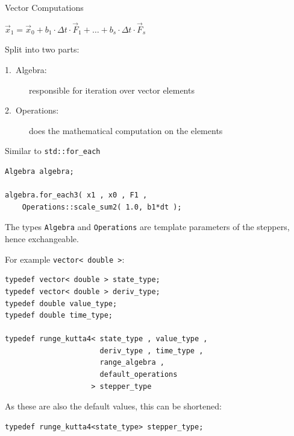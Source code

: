\documentclass{beamer}
\newcommand{\heading}[1]{\centerline{\Large #1} \vspace{0.5em}}
\begin{document}
\begin{frame}[fragile]
 \heading{Vector Computations}

\centerline{$\vec x_1 = \vec x_0 + b_1\cdot \Delta t \cdot \vec F_1 + \dots + b_s\cdot \Delta t \cdot \vec F_s$}

\vspace{0.5em}

Split into two parts:

\begin{description}
 \item[1.~Algebra:] responsible for iteration over vector elements
 \item[2.~Operations:] does the mathematical computation on the elements
\end{description}

\vspace{0.5em}

Similar to \lstinline+std::for_each+

\begin{lstlisting}
Algebra algebra;

algebra.for_each3( x1 , x0 , F1 ,
    Operations::scale_sum2( 1.0, b1*dt );
\end{lstlisting}
\pause

The types \lstinline+Algebra+ and \lstinline+Operations+ are template parameters of the steppers, hence exchangeable.
\end{frame}

\begin{frame}[fragile]


For example \lstinline+vector< double >+:
\begin{lstlisting}
typedef vector< double > state_type;
typedef vector< double > deriv_type;
typedef double value_type;
typedef double time_type;

typedef runge_kutta4< state_type , value_type , 
                      deriv_type , time_type , 
                      range_algebra , 
                      default_operations 
                    > stepper_type
\end{lstlisting}

\vspace{1em}
As these are also the default values, this can be shortened:
\begin{lstlisting}
typedef runge_kutta4<state_type> stepper_type; 
\end{lstlisting}

\end{frame}
\end{document}
